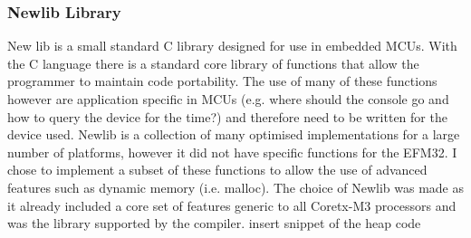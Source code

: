 \subsubsection{Newlib Library}
New lib is a small standard C library designed for use in embedded MCUs. With the C language there
is a standard core library of functions that allow the programmer to maintain code portability. The
use of many of these functions however are application specific in MCUs (e.g. where should the
console go and how to query the device for the time?) and therefore need to be written for the
device used. Newlib is a collection of many optimised implementations for a large number of
platforms, however it did not have specific functions for the EFM32. I chose to implement a subset
of these functions to allow the use of advanced features such as dynamic memory (i.e. malloc). The
choice of Newlib was made as it already included a core set of features generic to all Coretx-M3
processors and was the library supported by the compiler.
{insert snippet of the heap code}

